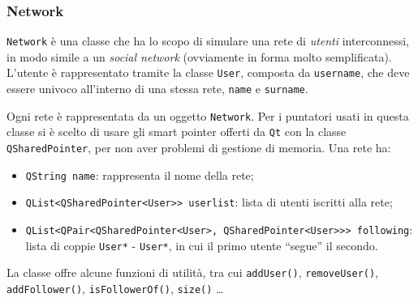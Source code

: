 \subsubsection{Network}
\texttt{Network} è una classe che ha lo scopo di simulare una rete di \emph{utenti} interconnessi, in modo simile
a un \emph{social network} (ovviamente in forma molto semplificata).
L'utente è rappresentato tramite la classe \texttt{User}, composta da \texttt{username}, che deve essere
univoco all'interno di una stessa rete, \texttt{name} e \texttt{surname}. \par
Ogni rete è rappresentata da un oggetto \texttt{Network}. Per i puntatori usati in questa classe si è scelto
di usare gli smart pointer offerti da \texttt{Qt} con la classe \texttt{QSharedPointer}, per non aver problemi di gestione
di memoria. Una rete ha:
\begin{itemize}
    \item \texttt{QString name}: rappresenta il nome della rete;
    \item \texttt{QList<QSharedPointer<User>> userlist}: lista di utenti iscritti alla rete;
    \item \texttt{QList<QPair<QSharedPointer<User>, QSharedPointer<User>>> following}: lista di coppie
    \texttt{User*} - \texttt{User*}, in cui il primo utente ``segue'' il secondo.
\end{itemize}
La classe offre alcune funzioni di utilità, tra cui \texttt{addUser()}, \texttt{removeUser()}, \texttt{addFollower()}, \texttt{isFollowerOf()}, \texttt{size()} \dots


